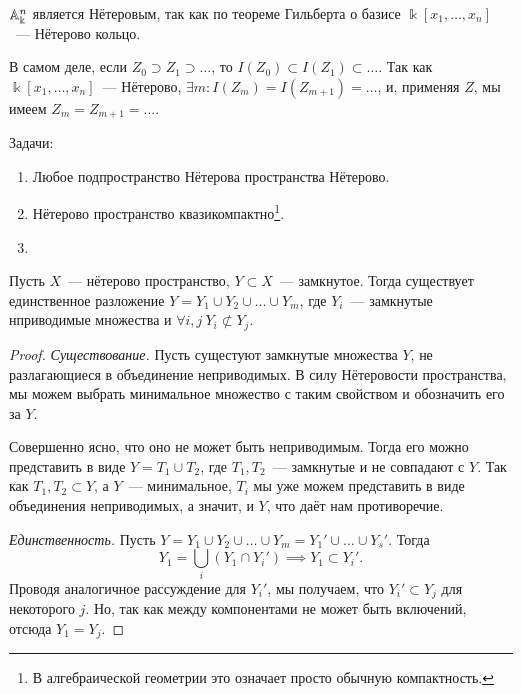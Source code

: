 	\begin{example}
		$\AA_{\Bbbk}^n$ является Нётеровым, так как по теореме Гильберта о базисе $\Bbbk[x_1, \ldots, x_n]$~--- Нётерово кольцо. 

		В самом деле, если $Z_0 \supset Z_1 \supset \ldots$, то $I(Z_0) \subset I(Z_1) \subset \ldots$. Так как $\Bbbk[x_1, \ldots, x_n]$~--- Нётерово, $\exists m\colon I(Z_m) = I(Z_{m + 1}) = \ldots$, и, применяя $Z$, мы имеем $Z_m = Z_{m + 1} = \ldots$. 
	\end{example}

	\begin{homework}
		Задачи:
		\begin{enumerate}
			\item Любое подпространство Нётерова пространства Нётерово. 

			\item Нётерово пространство квазикомпактно\footnote{В алгебраической геометрии это означает просто обычную компактность. }. 
			\item 
		\end{enumerate}
	\end{homework}

	\begin{theorem}[] 
		Пусть $X$~--- нётерово пространство, $Y \subset X$~--- замкнутое. Тогда существует единственное разложение $Y = Y_1 \cup Y_2 \cup \ldots \cup Y_m$, где $Y_i$~--- замкнутые нприводимые множества и $\forall i, j \ Y_i \not\subset Y_j$. 
	\end{theorem}
	\begin{proof}
		\emph{Существование.} Пусть сущестуют замкнутые множества $Y$, не разлагающиеся в объединение неприводимых. В силу Нётеровости пространства, мы можем выбрать минимальное множество с таким свойством и обозначить его за $Y$.

		Совершенно ясно, что оно не может быть неприводимым. Тогда его можно представить в виде $Y = T_1 \cup T_2$, где $T_1, T_2$~--- замкнутые и не совпадают с $Y$. Так как $T_1, T_2 \subset Y$, а $Y$~--- минимальное, $T_i$ мы уже можем представить в виде объединения неприводимых, а значит, и $Y$, что даёт нам противоречие. 

		\emph{Единственность.} Пусть $Y = Y_1 \cup Y_2 \cup \ldots \cup Y_m = Y_1' \cup \ldots \cup Y_s'$. Тогда 
		\[
			Y_1 = \bigcup_{i} (Y_1 \cap Y_i') \implies Y_1 \subset Y_i'.
		\]
		Проводя аналогичное рассуждение для $Y_i'$, мы получаем, что $Y_i' \subset Y_j$ для некоторого $j$. Но, так как между компонентами не может быть включений, отсюда $Y_1 = Y_j$.
	\end{proof}


